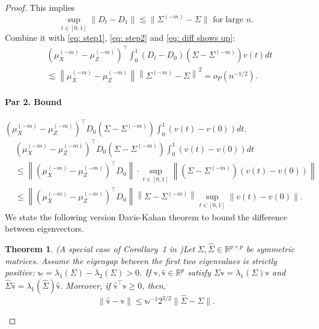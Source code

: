 \documentclass[11pt]{article}
\newtheorem{theorem}{Theorem}[section]
\begin{document}
\begin{proof}
This implies
\begin{equation*}
    \sup_{t\in[0,1]}\|D_t - D_1\| \lesssim \|\Sigma^{(-m)} - \Sigma\|\text{ for large }n.
\end{equation*}
Combine it with \eqref{eq: step1}, \eqref{eq: step2} and \eqref{eq: diff shows up}:
\begin{equation}\label{eq: conclusion part 1}
    \begin{aligned}
        &\left(\mu_X^{(-m)}-\mu_Z^{(-m)}\right)^{\top} \int_0^1\left(D_t-D_0\right)\left(\Sigma-\Sigma^{(-m)}\right) v(t) d t\\
        & \lesssim \left\|\mu_X^{(-m)}-\mu_Z^{(-m)}\right\|\left\|\Sigma^{(-m)}-\Sigma\right\|^2 = o_P(n^{-1/2}).
    \end{aligned}
\end{equation}

\paragraph{Par 2. Bound} $\left(\mu_X^{(-m)}-\mu_Z^{(-m)}\right)^{\top} D_0\left(\Sigma-\Sigma^{(-m)}\right) \int_0^1(v(t)-v(0)) d t$.
\begin{equation}\label{eq: step 3}
    \begin{aligned}
        &\left(\mu_X^{(-m)}-\mu_Z^{(-m)}\right)^{\top} D_0\left(\Sigma-\Sigma^{(-m)}\right) \int_0^1(v(t)-v(0)) d t\\
        & \leq \left\|\left(\mu_X^{(-m)}-\mu_Z^{(-m)}\right)^{\top} D_0\right\|\cdot \sup _{t \in[0,1]}\left\|\left(\Sigma-\Sigma^{(-m)}\right)(v(t)-v(0))\right\|\\
        & \leq \left\|\left(\mu_X^{(-m)}-\mu_Z^{(-m)}\right)^{\top} D_0\right\| \left\|\Sigma-\Sigma^{(-m)}\right\| \sup_{t\in[0,1]}\|v(t)-v(0)\|.
    \end{aligned}
\end{equation}
We state the following version Davis-Kahan theorem to bound the difference between eigenvectors.

\begin{theorem}(A special case of Corollary~1 in \cite{yu2015useful})\label{th: eigenvector pertubation}
    Let $\mathbb\Sigma, \mathbb{\hat{\Sigma}} \in \mathbb{R}^{p \times p}$ be symmetric matrices. Assume the eigengap between the first two eigenvalues is strictly positive: $\mathbb{w} = \lambda_{1}(\mathbb\Sigma) - \lambda_{2}(\mathbb\Sigma) > 0$. If $\mathbb{v}, \mathbb{\hat{v}} \in \mathbb{R}^p$ satisfy $\mathbb\Sigma \mathbb{v}=\lambda_1(\mathbb\Sigma) \mathbb{v}$ and $\mathbb{\hat{\Sigma}} \mathbb{\hat{v}}=\lambda_1(\mathbb{\hat{\Sigma}})\mathbb{\hat{v}}$. Moreover, if $\mathbb{\hat{v}}^{\top} \mathbb{v} \geq 0$, then,
$$
\|\mathbb{\hat{v}}-\mathbb v\| \leq \mathbb{w}^{-1}2^{3 / 2}\|\mathbb{\hat{\Sigma}}-\mathbb{\Sigma}\|.
$$
\end{theorem}


\end{proof}
\end{document}
